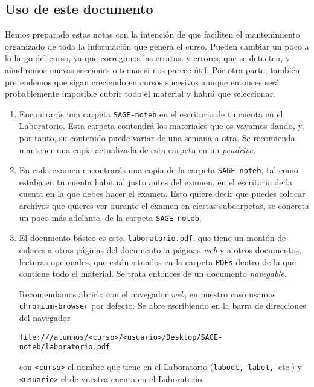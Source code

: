 \begin{appendices}
\chapter{Uso de este documento}\label{uso}

Hemos preparado estas notas  con la intenci\'on de que faciliten el
mantenimiento organizado de toda la informaci\'on que genera el curso.
Pueden cambiar un poco a lo largo del curso, ya que corregimos las erratas, y errores, que se detecten, y a\~nadiremos nuevas secciones o temas  si nos parece \'util.
Por otra parte, tambi\'en pretendemos que sigan creciendo en cursos sucesivos
aunque entonces ser\'a probablemente imposible cubrir todo el material y habr\'a
que seleccionar. 

\begin{enumerate}

\item \label{carpeta}Encontrar\'as una carpeta \verb|SAGE-noteb| en el escritorio de tu cuenta
en el Laboratorio. Esta carpeta contendr\'a  los materiales que os vayamos
dando, y, por tanto, su contenido puede variar de una semana a
otra. Se recomienda mantener  una copia actualizada de esta carpeta en un {\itshape pendrive}. 

\item En cada examen encontrar\'as una copia de la carpeta \verb|SAGE-noteb|,
tal como estaba en tu cuenta habitual justo antes del examen, en el escritorio
de la cuenta en la que debes hacer el examen. Esto quiere decir que puedes
colocar archivos que quieres ver durante el examen en ciertas subcarpetas, se
concreta un poco m\'as adelante,  de la carpeta \verb|SAGE-noteb|.


\item El documento b\'asico es este, \verb|laboratorio.pdf|, que tiene un
mont\'on de
enlaces a otras p\'aginas del documento,  a p\'aginas {\itshape web} y a otros
documentos, lecturas opcionales, que est\'an situados en la carpeta \verb|PDFs|
dentro de la que contiene todo el material. Se trata entonces de un documento
\emph{navegable.}

{\sc Recomendamos} abrirlo con el navegador {\itshape web}, en nuestro caso usamos {\tt chromium-browser} por defecto. Se abre escribiendo en la barra de direcciones del navegador
\small
\begin{center}
	{\tt file:///alumnos/<curso>/<usuario>/Desktop/SAGE-noteb/laboratorio.pdf}
\end{center}
\normalsize
\noindent con \verb|<curso>| el nombre que tiene en el Laboratorio ({\tt labodt,\ labot,\ }etc.) y \verb|<usuario>| el de vuestra cuenta en el Laboratorio.


\end{enumerate}
\end{appendices}
